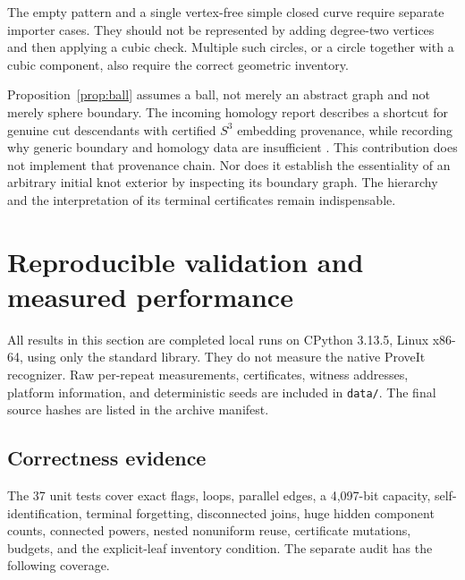 \documentclass[11pt,a4paper]{article}
\theoremstyle{definition}
\theoremstyle{remark}
\newcommand{\code}[1]{\nolinkurl{#1}}
\begin{document}
The empty pattern and a single vertex-free simple closed curve require separate importer cases. They should not be represented by adding degree-two vertices and then applying a cubic check. Multiple such circles, or a circle together with a cubic component, also require the correct geometric inventory.

Proposition~\ref{prop:ball} assumes a ball, not merely an abstract graph and not merely sphere boundary. The incoming homology report describes a shortcut for genuine cut descendants with certified $S^3$ embedding provenance, while recording why generic boundary and homology data are insufficient \cite{homology}. This contribution does not implement that provenance chain. Nor does it establish the essentiality of an arbitrary initial knot exterior by inspecting its boundary graph. The hierarchy and the interpretation of its terminal certificates remain indispensable.

\section{Reproducible validation and measured performance}
\label{sec:evidence}
All results in this section are completed local runs on CPython 3.13.5, Linux x86-64, using only the standard library. They do not measure the native ProveIt recognizer. Raw per-repeat measurements, certificates, witness addresses, platform information, and deterministic seeds are included in \code{data/}. The final source hashes are listed in the archive manifest.

\subsection{Correctness evidence}
The 37 unit tests cover exact flags, loops, parallel edges, a 4,097-bit capacity, self-identification, terminal forgetting, disconnected joins, huge hidden component counts, connected powers, nested nonuniform reuse, certificate mutations, budgets, and the explicit-leaf inventory condition. The separate audit has the following coverage.
\end{document}
